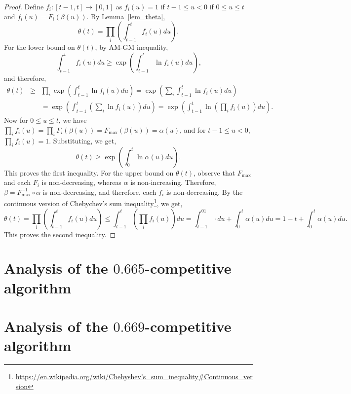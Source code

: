 \documentclass[10pt, letterpaper, twoside]{article}
\begin{document}
\begin{proof}
Define $f_i:[t-1,t]\longrightarrow[0,1]$ as $f_i(u)=1$ if $t-1\leq u<0$ if $0\leq u\leq t$ and $f_i(u)=F_i(\beta(u))$. By Lemma~\ref{lem_theta},
\[\theta(t)=\prod_i\left(\int_{t-1}^t f_i(u)du\right)\text{.}\]
For the lower bound on $\theta(t)$, by AM-GM inequality,
\[\int_{t-1}^tf_i(u)du\geq\exp\left(\int_{t-1}^t\ln f_i(u)du\right)\text{,}\]
and therefore,
\begin{eqnarray*}
\theta(t) & \geq & \prod_i\exp\left(\int_{t-1}^t\ln f_i(u)du\right)=\exp\left(\sum_i\int_{t-1}^t\ln f_i(u)du\right)\\
 & & =\exp\left(\int_{t-1}^t\left(\sum_i\ln f_i(u)\right)du\right)=\exp\left(\int_{t-1}^t\ln\left(\prod_i f_i(u)\right)du\right)\text{.}
\end{eqnarray*}
Now for $0\leq u\leq t$, we have $\prod_i f_i(u)=\prod_i F_i(\beta(u))=F_{\max}(\beta(u))=\alpha(u)$, and for $t-1\leq u<0$, $\prod_i f_i(u)=1$. Substituting, we get,
\[\theta(t)\geq\exp\left(\int_0^t\ln\alpha(u)du\right)\text{.}\]
This proves the first inequality. For the upper bound on $\theta(t)$, observe that $F_{\max}$ and each $F_i$ is non-decreasing, whereas $\alpha$ is non-increasing. Therefore, $\beta=F_{\max}^{-1}\circ\alpha$ is non-decreasing, and therefore, each $f_i$ is non-decreasing. By the continuous version of Chebychev's sum inequality\footnote{\url{https://en.wikipedia.org/wiki/Chebyshev's_sum_inequality\#Continuous_version}}, we get,
\[\theta(t)=\prod_i\left(\int_{t-1}^t f_i(u)du\right)\leq\int_{t-1}^t\left(\prod_if_i(u)\right)du=\int_{t-1}^01\cdot du+\int_0^t\alpha(u)du=1-t+\int_0^t\alpha(u)du\text{.}\]
This proves the second inequality.
\end{proof}



\section{Analysis of the $0.665$-competitive algorithm}



\section{Analysis of the $0.669$-competitive algorithm}
\end{document}
